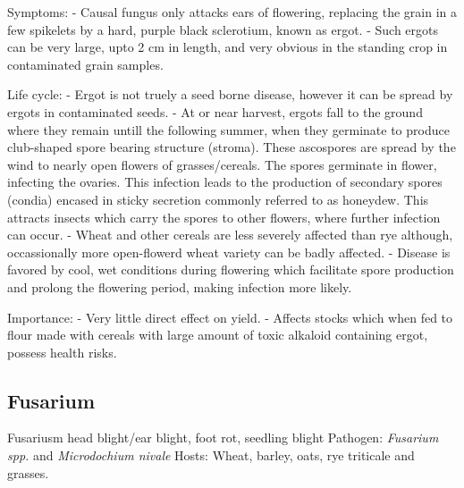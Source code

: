 \documentclass[
]{book}
\begin{document}
Symptoms:
- Causal fungus only attacks ears of flowering, replacing the grain in a few spikelets by a hard, purple black sclerotium, known as ergot.
- Such ergots can be very large, upto 2 cm in length, and very obvious in the standing crop in contaminated grain samples.

Life cycle:
- Ergot is not truely a seed borne disease, however it can be spread by ergots in contaminated seeds.
- At or near harvest, ergots fall to the ground where they remain untill the following summer, when they germinate to produce club-shaped spore bearing structure (stroma). These ascospores are spread by the wind to nearly open flowers of grasses/cereals. The spores germinate in flower, infecting the ovaries. This infection leads to the production of secondary spores (condia) encased in sticky secretion commonly referred to as honeydew. This attracts insects which carry the spores to other flowers, where further infection can occur.
- Wheat and other cereals are less severely affected than rye although, occassionally more open-flowerd wheat variety can be badly affected.
- Disease is favored by cool, wet conditions during flowering which facilitate spore production and prolong the flowering period, making infection more likely.

Importance:
- Very little direct effect on yield.
- Affects stocks which when fed to flour made with cereals with large amount of toxic alkaloid containing ergot, possess health risks.

\hypertarget{fusarium}{%
\subsection{Fusarium}\label{fusarium}}

Fusariusm head blight/ear blight, foot rot, seedling blight
Pathogen: \emph{Fusarium spp.} and \emph{Microdochium nivale}
Hosts: Wheat, barley, oats, rye triticale and grasses.
\end{document}
